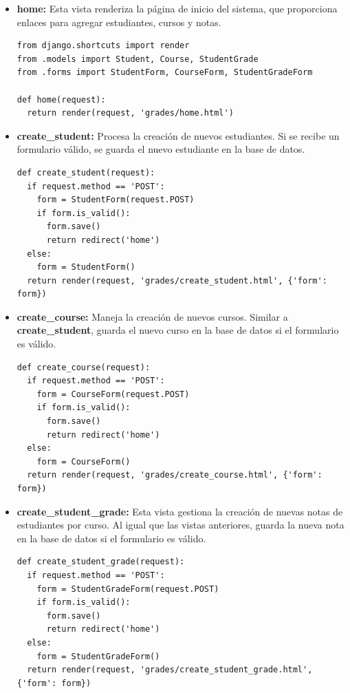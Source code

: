 \documentclass[10pt, a4paper]{article}
\begin{document}
\begin{itemize}
  \item \textbf{home:} Esta vista renderiza la página de inicio del sistema, que proporciona enlaces para agregar estudiantes, cursos y notas.

\begin{verbatim}
from django.shortcuts import render
from .models import Student, Course, StudentGrade
from .forms import StudentForm, CourseForm, StudentGradeForm

def home(request):
  return render(request, 'grades/home.html')
\end{verbatim}

  \item \textbf{create\_student:} Procesa la creación de nuevos estudiantes. Si se recibe un formulario válido, se guarda el nuevo estudiante en la base de datos.

\begin{verbatim}
def create_student(request):
  if request.method == 'POST':
    form = StudentForm(request.POST)
    if form.is_valid():
      form.save()
      return redirect('home')
  else:
    form = StudentForm()
  return render(request, 'grades/create_student.html', {'form': form})
\end{verbatim}


  \item \textbf{create\_course:} Maneja la creación de nuevos cursos. Similar a \textbf{create\_student}, guarda el nuevo curso en la base de datos si el formulario es válido.

\begin{verbatim}
def create_course(request):
  if request.method == 'POST':
    form = CourseForm(request.POST)
    if form.is_valid():
      form.save()
      return redirect('home')
  else:
    form = CourseForm()
  return render(request, 'grades/create_course.html', {'form': form})
\end{verbatim}
  
  \item \textbf{create\_student\_grade:} Esta vista gestiona la creación de nuevas notas de estudiantes por curso. Al igual que las vistas anteriores, guarda la nueva nota en la base de datos si el formulario es válido.

\begin{verbatim}
def create_student_grade(request):
  if request.method == 'POST':
    form = StudentGradeForm(request.POST)
    if form.is_valid():
      form.save()
      return redirect('home')
  else:
    form = StudentGradeForm()
  return render(request, 'grades/create_student_grade.html', {'form': form})
\end{verbatim}


\end{itemize}
\end{document}
